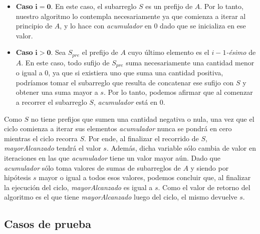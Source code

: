 \begin{itemize}
    \item \textbf{Caso} $\mathbf{i = 0}$. En este caso, el subarreglo $S$ es un prefijo de $A$. Por lo tanto, nuestro algoritmo lo contempla necesariamente ya que comienza a iterar al principio de $A$, y lo hace con \textit{acumulador} en $0$ dado que se inicializa en ese valor.

    \item \textbf{Caso} $\mathbf{i > 0}$. Sea $S_{pre}$ el prefijo de $A$ cuyo último elemento es el $i-1$\textit{-ésimo} de $A$. En este caso, todo sufijo de $S_{pre}$ suma necesariamente una cantidad menor o igual a $0$, ya que si existiera uno que suma una cantidad positiva, podríamos tomar el subarreglo que resulta de concatenar ese sufijo con $S$ y obtener una suma mayor a $s$. Por lo tanto, podemos afirmar que al comenzar a recorrer el subarreglo $S$, \textit{acumulador} está en $0$.
\end{itemize}

Como $S$ no tiene prefijos que sumen una cantidad negativa o nula, una vez que el ciclo comienza a iterar sus elementos \textit{acumulador} nunca se pondrá en cero mientras el ciclo recorra $S$. Por ende, al finalizar el recorrido de $S$, \textit{mayorAlcanzado} tendrá el valor $s$. Además, dicha variable sólo cambia de valor en iteraciones en las que \textit{acumulador} tiene un valor mayor aún. Dado que \textit{acumulador} sólo toma valores de sumas de subarreglos de $A$ y siendo por hipótesis $s$ mayor o igual a todos esos valores, podemos concluir que, al finalizar la ejecución del ciclo, \textit{mayorAlcanzado} es igual a $s$. Como el valor de retorno del algoritmo es el que tiene \textit{mayorAlcanzado} luego del ciclo, el mismo devuelve $s$.

\subsection{Casos de prueba}
